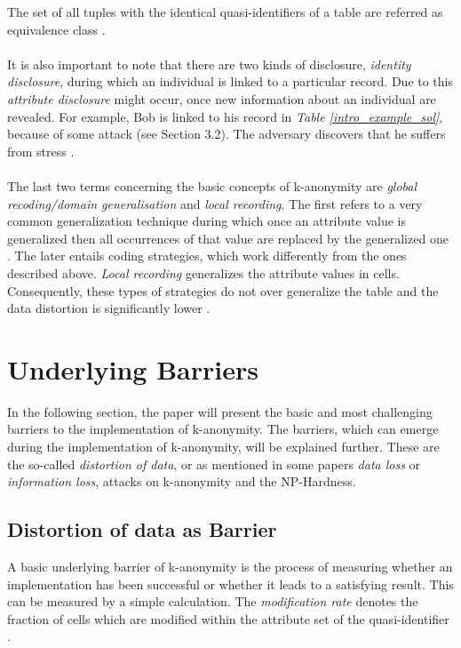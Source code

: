 \documentclass{llncs}
\begin{document}
The set of all tuples with the identical quasi-identifiers of a table are referred as equivalence class \cite{li2006achieving}.\\ \\
It is also important to note that there are two kinds of disclosure, \textit{ identity disclosure}, during which an individual is linked to a particular record. Due to this \textit{attribute disclosure} might occur, once new information about an individual are revealed. For example, Bob is linked to his record in \textit{Table \ref{intro_example_sol}}, because of some attack (see Section 3.2). The adversary discovers that he suffers from stress \cite{sweeney2002k}.\\\\
The last two terms concerning the basic concepts of k-anonymity are \textit{global recoding/domain generalisation} and \textit{local recording}. The first refers to a very common generalization technique during which once an attribute value is generalized then all occurrences of that value are replaced by the generalized one  \cite{sweeney2002k,sweeney2002achieving,li2006achieving,incognito}. The later entails coding strategies, which work differently from the ones described above. \textit{Local recording} generalizes the attribute values in cells. Consequently, these types of strategies do not over generalize the table and the data distortion is significantly lower \cite{li2006achieving}. 
 
\section{Underlying Barriers}

In the following section, the paper will present the basic and most challenging barriers to the implementation of k-anonymity. The barriers, which can emerge during the implementation of k-anonymity, will be explained further. These are the so-called \textit{distortion of data}, or as mentioned in some papers \textit{data loss} or \textit{information loss}, attacks on k-anonymity and the NP-Hardness. 
\subsection{Distortion of data as Barrier} \label{sec:Distortion of data as Barrier}

A basic underlying barrier of k-anonymity is the process of measuring whether an implementation has been successful or whether it leads to a satisfying result. This can be measured by a simple calculation. The \textit{modification rate} denotes the fraction of cells which are modified within the attribute set of the quasi-identifier \cite{li2006achieving}.
\end{document}
